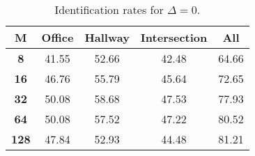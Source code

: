 \begin{table}[h]
    \footnotesize
    \centering
    \begin{tabular}{|c|c|c|c|l|}    
    \hline
    {\bf M} & {\bf Office} & {\bf Hallway} & {\bf Intersection} &     \multicolumn{1}{c|}{{\bf All}} \\ \hline
    {\bf 8} & 41.55 & 52.66 & 42.48 & 64.66 \\ \hline
    {\bf 16} & 46.76 & 55.79 & 45.64 & 72.65 \\ \hline
    {\bf 32} & 50.08 & 58.68 & 47.53 & 77.93 \\ \hline
    {\bf 64} & 50.08 & 57.52 & 47.22 & 80.52 \\ \hline
    {\bf 128} & 47.84 & 52.93 & 44.48 & 81.21 \\ \hline
    \end{tabular}
    \caption{Identification rates for $\Delta = 0$.}    
    \label{tab:identify_speakers_mit_19_0}
\end{table}
